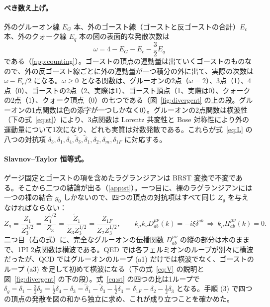 \documentclass[a4paper,10pt]{ltjsarticle}
\begin{document}
\paragraph{べき数え上げ。}外のグルーオン線 $E_G$ 本、外のゴースト線（ゴーストと反ゴーストの合計）$E_c$ 本、外のクォーク線 $E_q$ 本の図の表面的な発散次数は
\begin{equation}
\omega=4-E_G-E_c-\frac32E_q
\label{eq:omega}
\end{equation}
である（\ref{app:counting}）。ゴーストの頂点の運動量は出ていくゴーストのものなので、外の反ゴースト線ごとに外の運動量が一つ積分の外に出て、実際の次数は $\omega-E_c/2$ になる。$\omega\ge0$ となる関数は、グルーオンの2点（$\omega=2$）、3点（1）、4点（0）、ゴーストの2点（2、実際は1）、ゴースト頂点（1、実際は0）、クォークの2点（1）、クォーク頂点（0）の七つである（図~\ref{fig:divergent} の上の段。グルーオンの1点関数は色の添字が一つしかなく0）。グルーオンの2点関数は横波性（下の式~\eqref{eq:st}）により、3点関数は Lorentz 共変性と Bose 対称性により外の運動量について1次になり、どれも実質は対数発散である。これらが式~\eqref{eq:L} の八つの対抗項 $\delta_3,\delta_1,\delta_4,\tilde\delta_3,\tilde\delta_1,\delta_2,\delta_m,\delta_{1F}$ に対応する。

\paragraph{Slavnov--Taylor 恒等式。}ゲージ固定とゴーストの項を含めたラグランジアンは BRST 変換で不変である。そこから二つの結論が出る（\ref{app:st}）。一つ目に、裸のラグランジアンには一つの裸の結合 $g_0$ しかないので、四つの頂点の対抗項はすべて同じ $Z_g$ を与えなければならない：
\begin{equation}
Z_g=\frac{Z_1}{Z_3^{3/2}}=\frac{Z_4^{1/2}}{Z_3}=\frac{\tilde Z_1}{\tilde Z_3Z_3^{1/2}}=\frac{Z_{1F}}{Z_2Z_3^{1/2}},\qquad
k_\mu k_\nu D^{\mu\nu}_{ab}(k)=-i\xi\delta^{ab}\ \Longrightarrow\ k_\mu\Pi^{\mu\nu}_{ab}(k)=0.
\label{eq:st}
\end{equation}
二つ目（右の式）に、完全なグルーオンの伝播関数 $D^{\mu\nu}_{ab}$ の縦の部分は木のままで、1PI 2点関数は横波である。QED では各フェルミオンのループが別々に横波だったが、QCD ではグルーオンのループ (a1) だけでは横波でなく、ゴーストのループ (a3) を足して初めて横波になる（下の式~\eqref{eq:V} の説明と図~\ref{fig:divergent} の下の段）。式~\eqref{eq:st} の四つの比は1ループで $\delta_g=\delta_1-\frac32\delta_3=\frac12\delta_4-\delta_3=\tilde\delta_1-\tilde\delta_3-\frac12\delta_3=\delta_{1F}-\delta_2-\frac12\delta_3$ となる。手順 (3) で四つの頂点の発散を図の和から独立に求め、これが成り立つことを確かめた。
\end{document}
